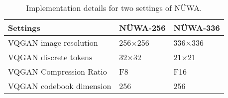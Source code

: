 \documentclass[10pt,twocolumn,letterpaper]{article}
\begin{document}
\begin{table}[t]
\footnotesize
\caption{Implementation details for two settings of NÜWA.}
\label{tab:detail}
\begin{tabular}{p{3.5cm}p{1.9cm}p{2.0cm}}
\toprule
Settings                                   & NÜWA-256                                   & NÜWA-336                                     \\

\midrule
VQGAN  image resolution                  & 256×256 & 336×336 \\
VQGAN  discrete tokens                  & 32×32 & 21×21\\
VQGAN   Compression Ratio                  & F8                                           & F16                                          \\
VQGAN   codebook dimension                 & 256                                          & 256                                          \\



\end{tabular}
\end{table}
\end{document}
